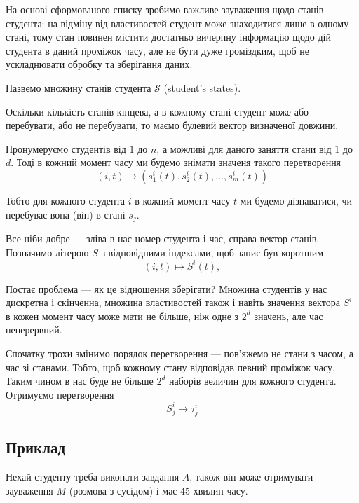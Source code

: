 На основі сформованого списку зробимо важливе зауваження щодо станів студента:
на відміну від властивостей студент може знаходитися лише в одному стані,
тому стан повинен містити достатньо вичерпну інформацію щодо дій студента
в даний проміжок часу, але не бути дуже громіздким, щоб не ускладнювати
обробку та зберігання даних.

Назвемо множину станів студента $\mathcal{S}$ (student's states).

Оскільки кількість станів кінцева, а в кожному стані студент може або
перебувати, або не перебувати, то маємо булевий вектор визначеної
довжини.

Пронумеруємо студентів від $1$ до $n$, а можливі для даного заняття стани
від $1$ до $d$.
Тоді в кожний момент часу ми будемо знімати значеня такого перетворення
\begin{equation*}
  \left( i,t \right) \mapsto \left( s_1^i\left( t \right),
    s_2^i\left( t \right), \dots, s_m^i\left( t \right) \right)
\end{equation*}

Тобто для кожного студента $i$ в кожний момент часу $t$ ми будемо
дізнаватися, чи перебуває вона (він) в стані $s_j$.

Все ніби добре --- зліва в нас номер студента і час, справа вектор станів.
Позначимо літерою $S$ з відповідними індексами, щоб запис був коротшим
\begin{equation*}
  \left( i,t \right) \mapsto S^i\left( t \right),
\end{equation*}

Постає проблема --- як це відношення зберігати?
Множина студентів у нас дискретна і скінченна, множина властивостей також і
навіть значення вектора $S^i$ в кожен момент часу може мати не більше, ніж одне
з $2^d$ значень, але час неперервний.

Спочатку трохи змінимо порядок перетворення --- пов’яжемо не стани з часом,
а час зі станами.
Тобто, щоб кожному стану відповідав певний проміжок часу.
Таким чином в нас буде не більше $2^d$ наборів величин для кожного студента.
Отримуємо перетворення
\begin{equation}\label{eq:stateMapsToTime}
  S_j^i \mapsto \tau_j^i
\end{equation}

\subsection{Приклад}
Нехай студенту треба виконати завдання $A$, також він може отримувати зауваження
$M$ (розмова з сусідом) і має $45$ хвилин часу.

